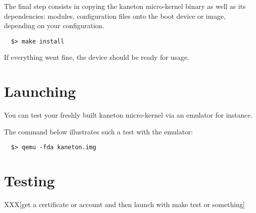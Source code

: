The final step consists in copying the kaneton micro-kernel binary as well as
its dependencies: modules, configuration files \etc{} onto the boot device
or image, depending on your configuration.

\begin{verbatim}
  $> make install
\end{verbatim}

If everything went fine, the device should be ready for usage.

%
%

\section{Launching}

You can test your freshly built kaneton micro-kernel via an emulator
for instance.

The command below illustrates such a test with the  emulator:

\begin{verbatim}
  $> qemu -fda kaneton.img
\end{verbatim}

%
%

\section{Testing}

XXX[get a certificate or account and then launch with make test or something]
